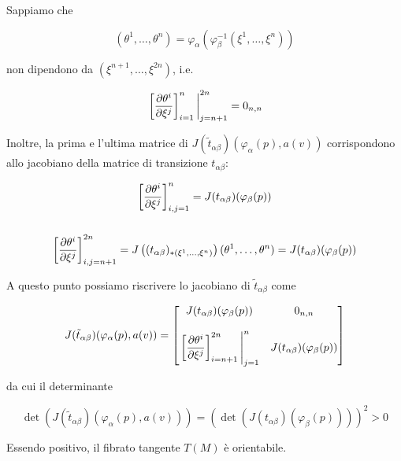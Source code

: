 {Sappiamo che

\begin{equation}
	(\theta^{1},\dots,\theta^{n}) = \varphi_{\alpha} \left( \varphi_{\beta}^{-1} (\xi^{1},\dots,\xi^{n}) \right)
\end{equation}

non dipendono da $ (\xi^{n+1},\dots,\xi^{2n}) $, i.e.

\begin{equation}
	\eval{ \left[ \dpdv{\theta^{i}}{\xi^{j}} \right]_{i=1}^{n} }_{j=n+1}^{2n} = 0_{n,n}
\end{equation}

Inoltre, la prima e l'ultima matrice di $ J(\tilde{t}_{\alpha \beta})(\varphi_{\alpha}(p),a(v)) $ corrispondono allo jacobiano della matrice di transizione $ t_{\alpha \beta} $:

\begin{gather}
	\left[ \dpdv{\theta^{i}}{\xi^{j}} \right]_{i,j=1}^{n} = J(t_{\alpha \beta})(\varphi_{\beta}(p)) \\
	\nonumber \\
	\left[ \dpdv{\theta^{i}}{\xi^{j}} \right]_{i,j=n+1}^{2n} = J \left( (t_{\alpha \beta})_{*(\xi^{1},\dots,\xi^{n})} \right) (\theta^{1},\dots,\theta^{n}) = J(t_{\alpha \beta})(\varphi_{\beta}(p))
\end{gather}

A questo punto possiamo riscrivere lo jacobiano di $ \tilde{t}_{\alpha \beta} $ come

\begin{equation}
	J(\tilde{t}_{\alpha \beta})(\varphi_{\alpha}(p),a(v)) = %
	\bmqty{ %
			J(t_{\alpha \beta})(\varphi_{\beta}(p)) & 0_{n,n} \\ \\
			\eval{ \left[ \dpdv{\theta^{i}}{\xi^{j}} \right]_{i=n+1}^{2n} }_{j=1}^{n} & J(t_{\alpha \beta})(\varphi_{\beta}(p)) %
			}
\end{equation}

da cui il determinante

\begin{equation}
	\det( J(\tilde{t}_{\alpha \beta})(\varphi_{\alpha}(p),a(v)) ) = \left( \det( J(t_{\alpha \beta})(\varphi_{\beta}(p)) ) \right)^{2} > 0
\end{equation}

Essendo positivo, il fibrato tangente $ T(M) $ è orientabile.
}


